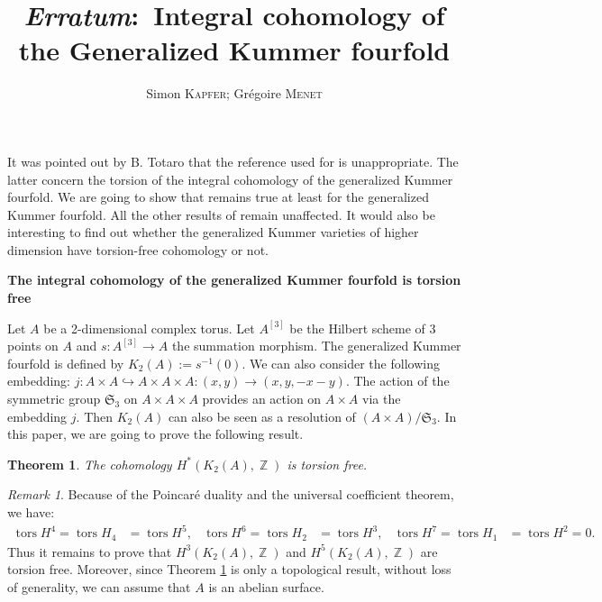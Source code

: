 \documentclass[a4paper]{article}
\newtheorem{thm}{Theorem}
\theoremstyle{remark}
\newtheorem{rmk}{Remark}
\DeclareMathOperator{\Z}{\mathbb{Z}}
\DeclareMathOperator{\tors}{tors}
\begin{document}
\title{\emph{Erratum}:\ \bf  Integral cohomology of the Generalized Kummer fourfold}

\author{Simon \textsc{Kapfer}; Gr\'egoire \textsc{Menet}} 

\maketitle
It was pointed out by B. Totaro that the reference used for \cite[Theorem 5.2]{Original} is unappropriate. The latter concern the torsion of the integral cohomology of the generalized Kummer fourfold. We are going to show that \cite[Theorem 5.2]{Original} remains true at least for the generalized Kummer fourfold. All the other results of \cite{Original} remain unaffected. It would also be interesting to find out whether the generalized Kummer varieties of higher dimension have torsion-free cohomology or not.
 \begin{center}
 \begin{large}
 \textbf{The integral cohomology of the generalized Kummer fourfold is torsion free}
 \end{large}
 \end{center}
Let $A$ be a 2-dimensional complex torus. Let $A^{[3]}$ be the Hilbert scheme of 3 points on $A$ and $s:A^{[3]}\rightarrow A$ the summation morphism.  
The generalized Kummer fourfold is defined by $K_2(A):=s^{-1}(0)$.
We can also consider the following embedding: $j:A\times A\hookrightarrow A\times A \times A: (x,y)\rightarrow (x,y,-x-y)$.
The action of the symmetric group $\mathfrak{S}_3$ on $A\times A \times A$ provides an action on $A\times A$ via the embedding $j$.
Then $K_2(A)$ can also be seen as a resolution of $\left(A\times A\right)/\mathfrak{S}_3$. 
In this paper, we are going to prove the following result.
\begin{thm}\label{main}
The cohomology $H^*(K_2(A),\Z)$ is torsion free.
\end{thm}
\begin{rmk}
Because of the Poincar\'e duality and the universal coefficient theorem, we have:
\begin{align*}
\tors H^4=\tors H_4&=\tors H^5,& \tors H^6=\tors H_2&=\tors H^3,& \tors H^7=\tors H_1&=\tors H^2=0.
\end{align*}
Thus it remains to prove that $H^3(K_2(A),\Z)$ and $H^5(K_2(A),\Z)$ are torsion free. Moreover, since Theorem \ref{main} is only a topological result, without loss of generality, we can assume that $A$ is an abelian surface.
\end{rmk}
\end{document}
